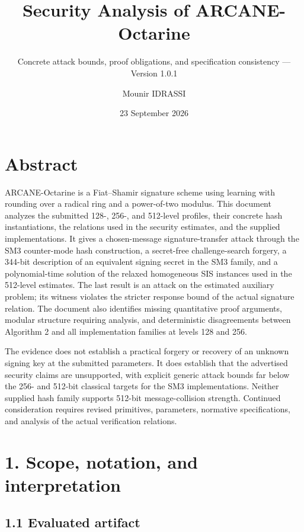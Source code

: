\documentclass[
  american,
  10pt,
  a4paper,
]{article}
\title{Security Analysis of ARCANE-Octarine}
\subtitle{Concrete attack bounds, proof obligations, and specification
consistency --- Version 1.0.1}
\author{Mounir IDRASSI}
\date{23 September 2026}
\begin{document}
\maketitle

\section*{Abstract}\label{abstract}

ARCANE-Octarine is a Fiat--Shamir signature scheme using learning with
rounding over a radical ring and a power-of-two modulus. This document
analyzes the submitted 128-, 256-, and 512-level profiles, their
concrete hash instantiations, the relations used in the security
estimates, and the supplied implementations. It gives a chosen-message
signature-transfer attack through the SM3 counter-mode hash
construction, a secret-free challenge-search forgery, a 344-bit
description of an equivalent signing secret in the SM3 family, and a
polynomial-time solution of the relaxed homogeneous SIS instances used
in the 512-level estimates. The last result is an attack on the
estimated auxiliary problem; its witness violates the stricter response
bound of the actual signature relation. The document also identifies
missing quantitative proof arguments, modular structure requiring
analysis, and deterministic disagreements between Algorithm 2 and all
implementation families at levels 128 and 256.

The evidence does not establish a practical forgery or recovery of an
unknown signing key at the submitted parameters. It does establish that
the advertised security claims are unsupported, with explicit generic
attack bounds far below the 256- and 512-bit classical targets for the
SM3 implementations. Neither supplied hash family supports 512-bit
message-collision strength. Continued consideration requires revised
primitives, parameters, normative specifications, and analysis of the
actual verification relations.

\clearpage
\begingroup
\small
\setlength{\parskip}{0pt}
\setcounter{tocdepth}{2}
\tableofcontents
\endgroup
\clearpage

\section{1. Scope, notation, and
interpretation}\label{scope-notation-and-interpretation}

\subsection{1.1 Evaluated artifact}\label{evaluated-artifact}
\end{document}
